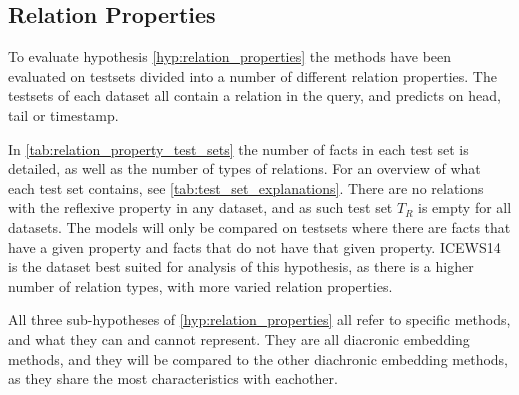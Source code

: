 \subsection{Relation Properties}
\label{sec:relation_properties_experiment}



%
%
%




To evaluate hypothesis \autoref{hyp:relation_properties} the methods have been evaluated on testsets divided into a number of different relation properties. The testsets of each dataset all contain a relation in the query, and predicts on head, tail or timestamp.

In \autoref{tab:relation_property_test_sets} the number of facts in each test set is detailed, as well as the number of types of relations.
For an overview of what each test set contains, see \autoref{tab:test_set_explanations}. There are no relations with the reflexive property in any dataset, and as such test set $T_R$ is empty for all datasets.
The models will only be compared on testsets where there are facts that have a given property and facts that do not have that given property. ICEWS14 is the dataset best suited for analysis of this hypothesis, as there is a higher number of relation types, with more varied relation properties.

All three sub-hypotheses of \autoref{hyp:relation_properties} all refer to specific methods, and what they can and cannot represent. They are all diacronic embedding methods, and they will be compared to the other diachronic embedding methods, as they share the most characteristics with eachother.

